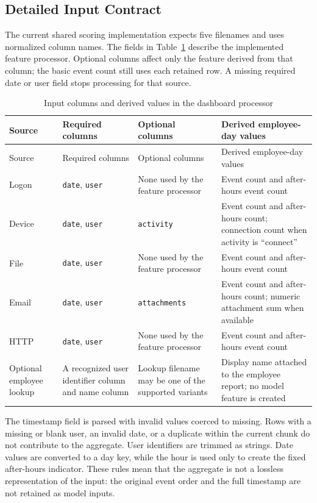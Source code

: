 \subsection{Detailed Input Contract}
The current shared scoring implementation expects five filenames and
uses normalized column names. The fields in Table~\ref{tab:input-contract}
describe the implemented feature processor. Optional columns affect
only the feature derived from that column; the basic event count still
uses each retained row. A missing required date or user field stops
processing for that source.

\begin{longtable}{|p{}|p{}|p{}|p{}|}
\caption{Input columns and derived values in the dashboard processor}\label{tab:input-contract}\\
\hline
Source & Required columns & Optional columns & Derived employee-day values\\
\hline
\endfirsthead
\hline
Source & Required columns & Optional columns & Derived employee-day values\\
\hline
\endhead
Logon & \texttt{date}, \texttt{user} & None used by the feature processor & Event count and after-hours event count\\
\hline
Device & \texttt{date}, \texttt{user} & \texttt{activity} & Event count and after-hours count; connection count when activity is ``connect''\\
\hline
File & \texttt{date}, \texttt{user} & None used by the feature processor & Event count and after-hours event count\\
\hline
Email & \texttt{date}, \texttt{user} & \texttt{attachments} & Event count and after-hours count; numeric attachment sum when available\\
\hline
HTTP & \texttt{date}, \texttt{user} & None used by the feature processor & Event count and after-hours event count\\
\hline
Optional employee lookup & A recognized user identifier column and name column & Lookup filename may be one of the supported variants & Display name attached to the employee report; no model feature is created\\
\hline
\end{longtable}

The timestamp field is parsed with invalid values coerced to missing.
Rows with a missing or blank user, an invalid date, or a duplicate within
the current chunk do not contribute to the aggregate. User identifiers
are trimmed as strings. Date values are converted to a day key, while
the hour is used only to create the fixed after-hours indicator. These
rules mean that the aggregate is not a lossless representation of the
input: the original event order and the full timestamp are not retained
as model inputs.

